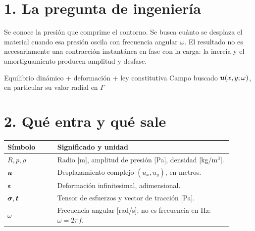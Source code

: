 \documentclass[11pt]{article}
\begin{document}
\base
\section*{1. La pregunta de ingeniería}
Se conoce la presión que comprime el contorno. Se busca cuánto se desplaza el
material cuando esa presión oscila con frecuencia angular \(\omega\).
El resultado no es necesariamente una contracción instantánea en fase con la
carga: la inercia y el amortiguamiento producen amplitud y desfase.

\begin{center}
\end{center}

{Equilibrio dinámico + deformación + ley constitutiva}
{Campo buscado \(\bm{u}(x,y;\omega)\), en particular su valor radial en \(\Gamma\)}

\section*{2. Qué entra y qué sale}
\begin{tabular}{p{0.20\linewidth}p{0.70\linewidth}}
\toprule
Símbolo & Significado y unidad\\
\midrule
\(R,p,\rho\) & Radio [m], amplitud de presión [Pa], densidad [kg/m\(^{3}\)].\\
\(\bm{u}\) & Desplazamiento complejo \((u_x,u_y)\), en metros.\\
\(\boldsymbol\varepsilon\) & Deformación infinitesimal, adimensional.\\
\(\boldsymbol\sigma,\bm{t}\) & Tensor de esfuerzos y vector de tracción [Pa].\\
\(\omega\) & Frecuencia angular [rad/s]; no es frecuencia en Hz: \(\omega=2\pi f\).\\
\bottomrule
\end{tabular}
\end{document}
